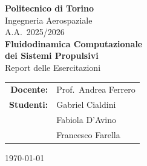 \documentclass[12pt, a4paper]{report}
\begin{document}
\begin{titlepage}
  \centering
  \vspace*{1cm}
  {\Large\bfseries Politecnico di Torino}\\[0.3cm]
  {\large Ingegneria Aerospaziale}\\[0.1cm]
  {\large A.A.\ 2025/2026}\\[2.5cm]

  {\Huge\bfseries Fluidodinamica Computazionale\\[0.4cm]
  dei Sistemi Propulsivi}\\[0.5cm]
  {\large Report delle Esercitazioni}\\[3cm]

  \begin{tabular}{rl}
    \textbf{Docente:} & Prof.\ Andrea Ferrero \\[0.3cm]
    \textbf{Studenti:} & Gabriel Cialdini \\
                       & Fabiola D'Avino \\
                       & Francesco Farella
  \end{tabular}

  \vfill
  {\large \today}
\end{titlepage}

\tableofcontents
\listoffigures
\listoftables
\clearpage










\end{document}
